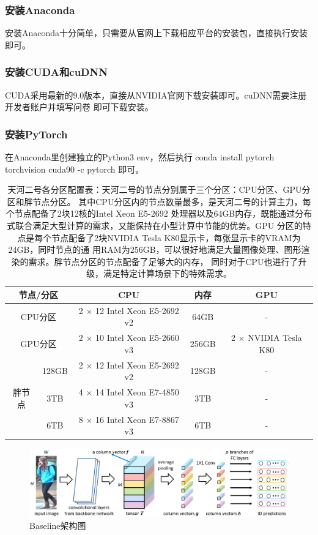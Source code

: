\subsubsection{安装Anaconda}

安装Anaconda十分简单，只需要从官网上下载相应平台的安装包，直接执行安装即可。

\subsubsection{安装CUDA和cuDNN}

CUDA采用最新的9.0版本，直接从NVIDIA官网下载安装即可。cuDNN需要注册开发者账户并填写问卷
即可下载安装。

\subsubsection{安装PyTorch}

在Anaconda里创建独立的Python3 env，然后执行
conda install pytorch torchvision cuda90 -c pytorch 即可。

\begin{table}[]
\centering
\caption{天河二号各分区配置表：天河二号的节点分别属于三个分区：CPU分区、GPU分区和胖节点分区。
其中CPU分区内的节点数量最多，是天河二号的计算主力，每个节点配备了2块12核的Intel Xeon E5-2692
处理器以及64GB内存，既能通过分布式联合满足大型计算的需求，又能保持在小型计算中节能的优势。GPU
分区的特点是每个节点配备了2块NVIDIA Tesla K80显示卡，每张显示卡的VRAM为24GB，同时节点的通
用RAM为256GB，可以很好地满足大量图像处理、图形渲染的需求。胖节点分区的节点配备了足够大的内存，
同时对于CPU也进行了升级，满足特定计算场景下的特殊需求。}

\label{tab:tianheconfig}
\begin{tabular}{|c|c|c|c|c|}
\hline
\multicolumn{2}{|c|}{节点/分区}  & CPU                          & 内存    & GPU                  \\ \hline
\multicolumn{2}{|c|}{CPU分区}  & 2 $\times$ 12 Intel Xeon E5-2692 v2 & 64GB  & -                    \\ \hline
\multicolumn{2}{|c|}{GPU分区}  & 2 $\times$ 10 Intel Xeon E5-2660 v3 & 256GB & 2 $\times$ NVIDIA Tesla K80 \\ \hline
\multirow{3}{*}{胖节点} & 128GB & 2 $\times$ 12 Intel Xeon E5-2692 v2 & 128GB & -                    \\ \cline{2-5}
                     & 3TB   & 4 $\times$ 14 Intel Xeon E7-4850 v3 & 3TB   & -                    \\ \cline{2-5}
                     & 6TB   & 8 $\times$ 16 Intel Xeon E7-8867 v3 & 6TB   & -                    \\ \hline
\end{tabular}
\end{table}

\begin{figure}
\centering
\includegraphics[width=1\textwidth]{figure/structure}
\caption{Baseline架构图}
\label{fig:baseline}
\end{figure}
